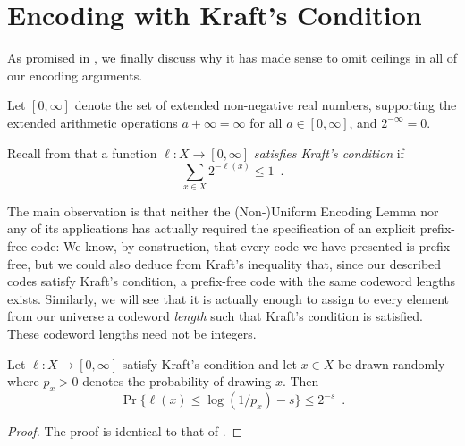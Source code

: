 \documentclass[format=acmsmall, review=false, screen=true]{acmart}
\begin{document}
\section{Encoding with Kraft's Condition}

As promised in , we finally discuss why it has made
sense to omit ceilings in all of our encoding arguments.

Let $[0, \infty]$ denote the set of extended non-negative real
numbers, supporting the extended arithmetic operations
$a + \infty = \infty$ for all $a \in [0, \infty]$, and
$2^{-\infty} = 0$.

  Recall from 
that a function $\ell : X \to [0, \infty]$ \emph{satisfies Kraft's
  condition} if
\[
  \sum_{x \in X} 2^{-\ell(x)} \leq 1 \enspace .
\]

The main observation is that neither the (Non-)Uniform Encoding Lemma
nor any of its applications has actually required the specification of an
explicit
prefix-free code: We know, by construction, that every code we have
presented is
prefix-free, but we could also deduce from Kraft's inequality that,
since our described codes satisfy Kraft's condition, a prefix-free
code with the same codeword lengths exists. Similarly, we will see that
it is actually enough to assign to every element from our universe
a codeword \emph{length} such that Kraft's condition is satisfied. These
codeword lengths need not be integers.

\begin{lem}
  Let $\ell : X \to [0, \infty]$ satisfy Kraft's condition and let
  $x\in X$ be drawn randomly where $p_x > 0$ denotes the probability
  of drawing $x$.  Then
  \[
    \Pr\{ \ell(x) \le \log(1/p_x)-s\} \le 2^{-s} \enspace .
  \]
\end{lem}
\begin{proof}
  The proof is identical to that of .
\end{proof}
\end{document}
